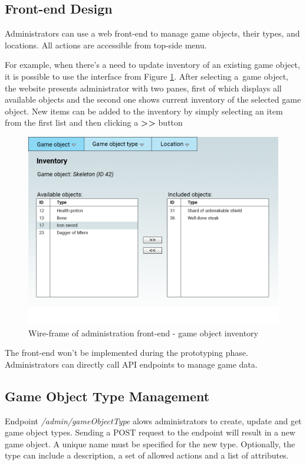 	\subsection{Front-end Design}
	Administrators can use a web front-end to manage game objects, their types, and locations. All actions are accessible from top-side menu. 
	
	For example, when there's a need to update inventory of an existing game object, it is possible to use the interface from Figure \ref{fig:wireframegameobject}. After selecting a~game object, the website presents administrator with two panes, first of which displays all available objects and the second one shows current inventory of the selected game object. New items can be added to the inventory by simply selecting an item from the first list and then clicking a \textbf{>>} button
	
	\begin{figure}[h]	
		\includegraphics[width=\textwidth]{figures/GameObjectAdminWireframe}
		\centering			
		\caption{Wire-frame of administration front-end - game object inventory}
		\label{fig:wireframegameobject}
	\end{figure}	
	
	The front-end won't be implemented during the prototyping phase. Administrators can directly call API endpoints to manage game data.	

	\subsection{Game Object Type Management}
	Endpoint \textit{/admin/gameObjectType} alows administrators to create, update and get game object types. Sending a POST request to the endpoint will result in a new game object. A unique name must be specified for the new type. Optionally, the type can include a description, a set of allowed actions and a list of attributes.
	
